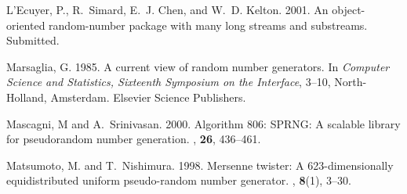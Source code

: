 \documentclass[12pt]{article}
\newenvironment {refer}{
  \begin {list}{}{
  \def\newblock {\hskip .11em plus .33em minus .07em}
  \setlength {\itemsep}{2pt}
  \setlength {\parsep}{0pt}
  \setlength {\parindent}{20pt}
  \setlength {\leftmargin}{+\parindent}
  \setlength {\itemindent}{-\parindent}}}{\end{list}}
\begin{document}
\begin{refer}
L'Ecuyer, P., R.~Simard, E.~J. Chen, and W.~D. Kelton. 2001.
\newblock An object-oriented random-number package with many long streams and
  substreams.
\newblock Submitted.

Marsaglia, G. 1985.
\newblock A current view of random number generators.
\newblock In {\em Computer Science and Statistics, Sixteenth Symposium on the
  Interface}, 3--10, North-Holland, Amsterdam. Elsevier Science Publishers.

Mascagni, M and A.~Srinivasan. 2000.
\newblock Algorithm 806: {SPRNG}: A scalable library for pseudorandom number
  generation.
,  {\bf 26},
  436--461.

Matsumoto, M. and T.~Nishimura. 1998.
\newblock Mersenne twister: A 623-dimensionally equidistributed uniform
  pseudo-random number generator.
,  {\bf
  8}(1), 3--30.

\end{refer}

\else  %
\end{document}
